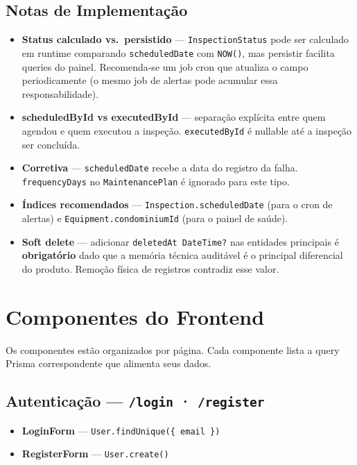 \documentclass[12pt, a4paper]{article}
\begin{document}
\subsection{Notas de Implementação}

\begin{itemize}[leftmargin=1.5em]
    \item \textbf{Status calculado vs.\ persistido} — \texttt{InspectionStatus} pode ser
    calculado em runtime comparando \texttt{scheduledDate} com \texttt{NOW()}, mas
    persistir facilita queries do painel. Recomenda-se um job cron que atualiza o campo
    periodicamente (o mesmo job de alertas pode acumular essa responsabilidade).
    \item \textbf{scheduledById vs executedById} — separação explícita entre quem agendou
    e quem executou a inspeção. \texttt{executedById} é nullable até a inspeção ser concluída.
    \item \textbf{Corretiva} — \texttt{scheduledDate} recebe a data do registro da falha.
    \texttt{frequencyDays} no \texttt{MaintenancePlan} é ignorado para este tipo.
    \item \textbf{Índices recomendados} — \texttt{Inspection.scheduledDate} (para o cron
    de alertas) e \texttt{Equipment.condominiumId} (para o painel de saúde).
    \item \textbf{Soft delete} — adicionar \texttt{deletedAt DateTime?} nas entidades
    principais é \textbf{obrigatório} dado que a memória técnica auditável é o principal
    diferencial do produto. Remoção física de registros contradiz esse valor.
\end{itemize}

\vspace{0.5cm}

\section{Componentes do Frontend}
\label{sec:frontend}

Os componentes estão organizados por página. Cada componente lista a query Prisma
correspondente que alimenta seus dados.

\subsection{Autenticação — \texttt{/login} · \texttt{/register}}

\begin{itemize}[leftmargin=1.5em]
    \item \textbf{LoginForm} — \texttt{User.findUnique(\{ email \})}
    \item \textbf{RegisterForm} — \texttt{User.create()}
\end{itemize}
\end{document}
